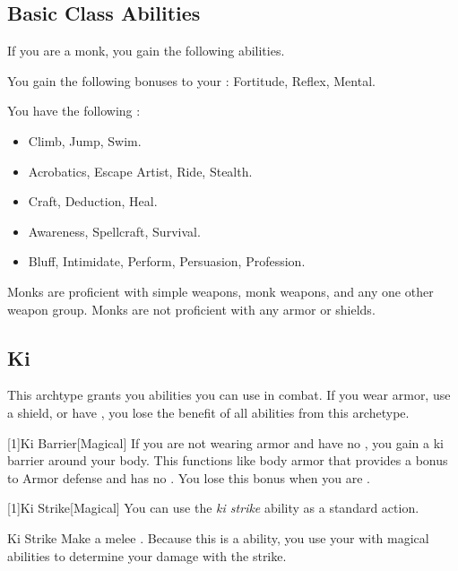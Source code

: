     \subsection{Basic Class Abilities}
        If you are a monk, you gain the following abilities.

        You gain the following bonuses to your :  Fortitude,  Reflex,  Mental.

        You have the following :
        \begin{itemize}
            \item {} Climb, Jump, Swim.
            \item {} Acrobatics, Escape Artist, Ride, Stealth.
            \item {} Craft, Deduction, Heal.
            \item {} Awareness, Spellcraft, Survival.
            \item {} Bluff, Intimidate, Perform, Persuasion, Profession.
        \end{itemize}

        Monks are proficient with simple weapons, monk weapons, and any one other weapon group.
        Monks are not proficient with any armor or shields.

    \subsection{Ki}
        This archtype grants you abilities you can use in combat.
        If you wear armor, use a shield, or have , you lose the benefit of all abilities from this archetype.

        [1]{Ki Barrier}[Magical]
        If you are not wearing armor and have no , you gain a ki barrier around your body.
        This functions like body armor that provides a  bonus to Armor defense and has no .
        You lose this bonus when you are \helpless.

        [1]{Ki Strike}[Magical] You can use the \textit{ki strike} ability as a standard action.
        \begin{freeability}{Ki Strike}
            Make a melee .
            Because this is a  ability, you use your  with magical abilities to determine your damage with the strike.
        \end{freeability}

